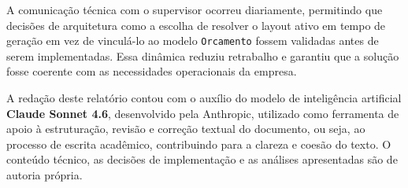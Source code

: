 A comunicação técnica com o supervisor ocorreu diariamente, permitindo que decisões de arquitetura 
como a escolha de resolver o layout ativo em tempo de geração em vez de vinculá-lo ao modelo
\texttt{Orcamento} fossem validadas antes de serem implementadas. Essa dinâmica reduziu retrabalho e
garantiu que a solução fosse coerente com as necessidades operacionais da empresa.

A redação deste relatório contou com o auxílio do modelo de inteligência artificial
\textbf{Claude Sonnet 4.6}, desenvolvido pela Anthropic, utilizado como ferramenta de apoio
à estruturação, revisão e correção textual do documento, ou seja, ao processo de escrita acadêmico, contribuindo para a clareza e coesão do texto. O conteúdo técnico, as decisões de
implementação e as análises apresentadas são de autoria própria.